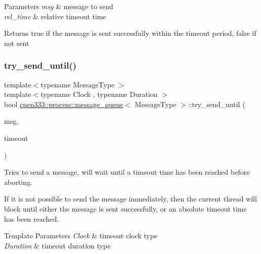 \begin{DoxyParams}{Parameters}
{\em msg} & message to send \\
\hline
{\em rel\+\_\+time} & relative timeout time \\
\hline
\end{DoxyParams}
\begin{DoxyReturn}{Returns}
{\ttfamily true} if the message is sent successfully within the timeout period, {\ttfamily false} if not sent 
\end{DoxyReturn}
\mbox{\label{classcpen333_1_1process_1_1message__queue_ab13d8f1c89ca9022e5446b3fc5432072}} 
\subsubsection{\texorpdfstring{try\+\_\+send\+\_\+until()}{try\_send\_until()}}
{\footnotesize\ttfamily template$<$typename Message\+Type $>$ \\
template$<$typename Clock , typename Duration $>$ \\
bool \hyperlink{classcpen333_1_1process_1_1message__queue}{cpen333\+::process\+::message\+\_\+queue}$<$ Message\+Type $>$\+::try\+\_\+send\+\_\+until (\begin{DoxyParamCaption}\item[{const Message\+Type \&}]{msg,  }\item[{const std\+::chrono\+::time\+\_\+point$<$ Clock, Duration $>$ \&}]{timeout }\end{DoxyParamCaption})\hspace{0.3cm}{\ttfamily [inline]}}



Tries to send a message, will wait until a timeout time has been reached before aborting. 

If it is not possible to send the message immediately, then the current thread will block until either the message is sent successfully, or an absolute timeout time has been reached.


\begin{DoxyTemplParams}{Template Parameters}
{\em Clock} & timeout clock type \\
\hline
{\em Duration} & timeout duration type \\
\hline
\end{DoxyTemplParams}

